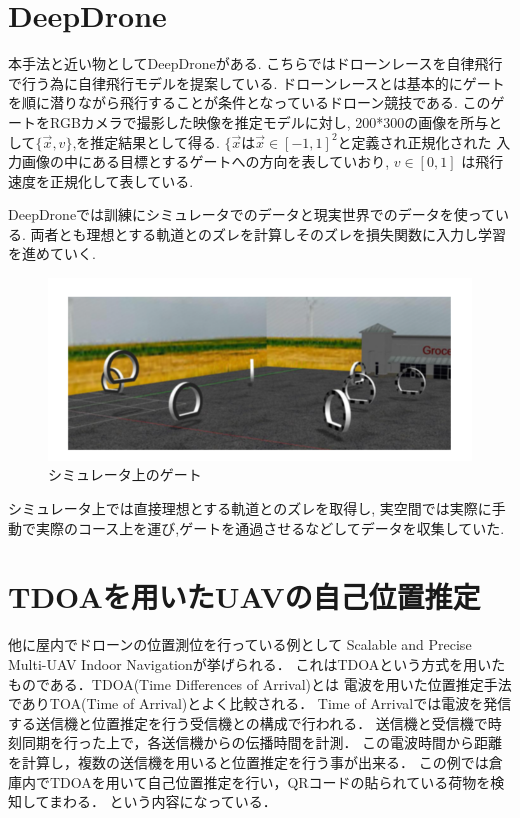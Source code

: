 \section{DeepDrone}
本手法と近い物としてDeepDrone\cite{DeepDrone}がある.
こちらではドローンレースを自律飛行で行う為に自律飛行モデルを提案している.
ドローンレースとは基本的にゲートを順に潜りながら飛行することが条件となっているドローン競技である.
このゲートをRGBカメラで撮影した映像を推定モデルに対し,
200*300の画像を所与として$\lbrace \vec{x}, v \rbrace$,を推定結果として得る.
$\lbrace \vec{x}$は$\vec{x} \in [-1,1]^2$と定義され正規化された
入力画像の中にある目標とするゲートへの方向を表していおり,
 $v \in [0,1]$ は飛行速度を正規化して表している. 

DeepDroneでは訓練にシミュレータでのデータと現実世界でのデータを使っている.
両者とも理想とする軌道とのズレを計算しそのズレを損失関数に入力し学習を進めていく.
\begin{figure}[htbp]
  \begin{center}
    \includegraphics[clip,width=15.0cm]{img/deep-simu.png}
    \caption{シミュレータ上のゲート}
    \label{fig:gate}
  \end{center}
\end{figure}
シミュレータ上では直接理想とする軌道とのズレを取得し,
実空間では実際に手動で実際のコース上を運び,ゲートを通過させるなどしてデータを収集していた.

\section{TDOAを用いたUAVの自己位置推定}
他に屋内でドローンの位置測位を行っている例として
Scalable and Precise Multi-UAV Indoor Navigation\cite{TDOA-UWB}が挙げられる．
これはTDOAという方式を用いたものである．TDOA(Time Differences of Arrival)\cite{tdoa}とは
電波を用いた位置推定手法でありTOA(Time of Arrival)とよく比較される．
Time of Arrivalでは電波を発信する送信機と位置推定を行う受信機との構成で行われる．
送信機と受信機で時刻同期を行った上で，各送信機からの伝播時間を計測．
この電波時間から距離を計算し，複数の送信機を用いると位置推定を行う事が出来る．
この例では倉庫内でTDOAを用いて自己位置推定を行い，QRコードの貼られている荷物を検知してまわる．
という内容になっている．

